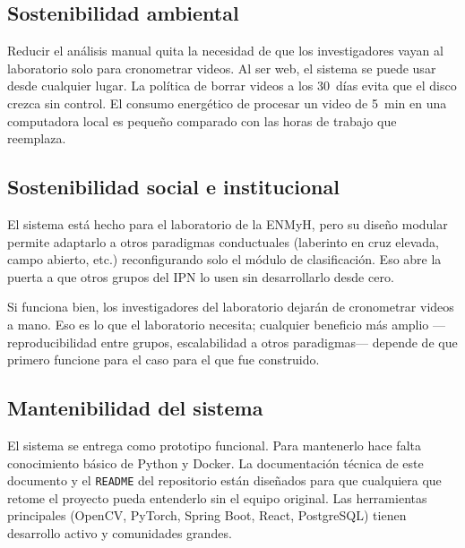 \subsection{Sostenibilidad ambiental}

Reducir el análisis manual quita la necesidad de que los investigadores vayan al
laboratorio solo para cronometrar videos. Al ser web, el sistema se puede usar desde
cualquier lugar. La política de borrar videos a los 30~días evita que el disco crezca
sin control. El consumo energético de procesar un video de 5~min en una computadora
local es pequeño comparado con las horas de trabajo que reemplaza.

\subsection{Sostenibilidad social e institucional}

El sistema está hecho para el laboratorio de la ENMyH, pero su diseño modular permite
adaptarlo a otros paradigmas conductuales (laberinto en cruz elevada, campo abierto,
etc.) reconfigurando solo el módulo de clasificación. Eso abre la puerta a que otros
grupos del IPN lo usen sin desarrollarlo desde cero.

Si funciona bien, los investigadores del laboratorio dejarán de cronometrar videos a mano. Eso es lo que
el laboratorio necesita; cualquier beneficio más amplio ---reproducibilidad entre
grupos, escalabilidad a otros paradigmas--- depende de que primero funcione para
el caso para el que fue construido.

\subsection{Mantenibilidad del sistema}

El sistema se entrega como prototipo funcional. Para mantenerlo hace falta conocimiento
básico de Python y Docker. La documentación técnica de este documento y el
\texttt{README} del repositorio están diseñados para que cualquiera que retome el
proyecto pueda entenderlo sin el equipo original. Las herramientas principales (OpenCV,
PyTorch, Spring Boot, React, PostgreSQL) tienen desarrollo activo y comunidades grandes.
